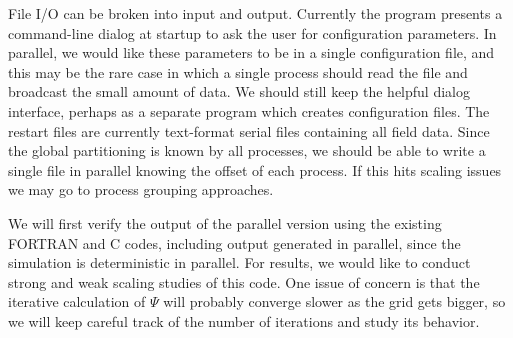 \documentclass{article}
\begin{document}
File I/O can be broken into input and output.
Currently the program presents a command-line dialog at startup
to ask the user for configuration parameters.
In parallel, we would like these parameters to be in a single
configuration file, and this may be the rare case in which a single
process should read the file and broadcast the small amount of data.
We should still keep the helpful dialog interface, perhaps as a separate
program which creates configuration files.
The restart files are currently text-format serial files containing
all field data.
Since the global partitioning is known by all processes, we should
be able to write a single file in parallel knowing the offset of
each process.
If this hits scaling issues we may go to process grouping approaches.

We will first verify the output of the parallel version using the
existing FORTRAN and C codes, including output generated in parallel,
since the simulation is deterministic in parallel.
For results, we would like to conduct strong and weak scaling studies
of this code.
One issue of concern is that the iterative calculation of $\Psi$ will
probably converge slower as the grid gets bigger, so we will keep
careful track of the number of iterations and study its behavior.
\end{document}
